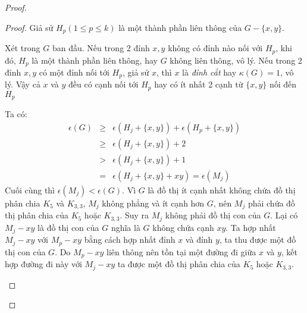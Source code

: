 \begin{proof}
\begin{enumerate}
\begin{proof}
                  Giả sử $H_p (1 \leq p \leq k)$ là một thành phần liên thông của $G- \{x,y\}$.

                  Xét trong $G$ ban đầu. Nếu trong 2 đỉnh $x,y$ không có đỉnh nào nối với $H_p$, khi đó, $H_p$ là một thành phần liên thông, hay $G$ không liên thông, vô lý.
                  Nếu trong 2 đỉnh $x,y$ có một đỉnh nối tới $H_p$, giả sử $x$, thì $x$ là \textit{đỉnh cắt} hay $\kappa(G)=1$, vô lý.
                  Vậy cả $x$ và $y$ đều có cạnh nối tới $H_p$ hay có ít nhất 2 cạnh từ $\{x,y\}$ nối đến $H_p$

                  Ta có:
                  \begin{eqnarray*}
                      \epsilon(G)& \geq &\epsilon(H_j+\{x,y\}) + \epsilon(H_p +\{x,y\}) \\
                      & \geq & \epsilon(H_j+\{x,y\}) + 2\\
                      & > & \epsilon(H_j+\{x,y\}) + 1 \\
                      & = & \epsilon(H_j+\{x,y\} + xy) = \epsilon(M_j)
                  \end{eqnarray*}
                  Cuối cùng thì $\epsilon(M_j) < \epsilon(G)$. Vì $G$ là đồ thị ít cạnh nhất không chứa đồ thị phân chia $K_5$ và $K_{3,3}$, $M_j$ không phẳng và ít cạnh hơn $G$, nên $M_j$ phải chứa đồ thị phân chia của $K_5$ hoặc $K_{3,3}$.
                  Suy ra $M_j$ không phải đồ thị con của $G$.
                  Lại có $M_j -xy$ là đồ thị con của $G$ nghĩa là $G$ không chứa cạnh $xy$.
                  Ta hợp nhất $M_j-xy$ với $M_p-xy$ bằng cách hợp nhất đỉnh $x$ và đỉnh $y$, ta thu được một đồ thị con của $G$.
                  Do $M_p -xy$ liên thông nên tồn tại một đường đi giữa $x$ và $y$, kết hợp đường đi này với $M_j-xy$ ta được một đồ thị phân chia của  $K_5$ hoặc $K_{3,3}$.
                  \begin{figure}[H]
                      \centering
\end{figure}
\end{proof}
\end{enumerate}
\end{proof}
